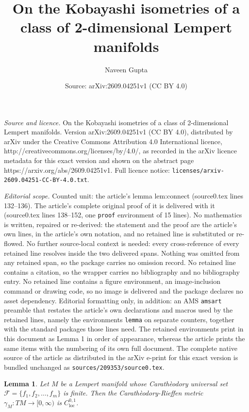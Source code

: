 \documentclass[10pt,a4paper]{amsart}
\title{On the Kobayashi isometries of a class of 2-dimensional Lempert manifolds}
\author{Naveen Gupta}
\date{Source: arXiv:2609.04251v1 (CC BY 4.0)}
\newtheorem{lemma}{Lemma}
\begin{document}
\maketitle

\noindent\emph{Source and licence.} On the Kobayashi isometries of a class of 2-dimensional Lempert manifolds. Version arXiv:2609.04251v1 (CC BY 4.0), distributed by arXiv under the Creative Commons Attribution 4.0 International licence, http://creativecommons.org/licenses/by/4.0/, as recorded in the arXiv licence metadata for this exact version and shown on the abstract page https://arxiv.org/abs/2609.04251v1. Full licence notice: \texttt{licenses/arxiv-2609.04251-CC-BY-4.0.txt}.\par\smallskip

\noindent\textit{Editorial scope.} Counted unit: the article's lemma lem:connect (source0.tex lines 132--136). The article's complete original proof of it is delivered with it (source0.tex lines 138--152, one \texttt{proof} environment of 15 lines). No mathematics is written, repaired or re-derived: the statement and the proof are the article's own lines, in the article's own notation, and no retained line is substituted or re-flowed.  No further source-local context is needed: every cross-reference of every retained line resolves inside the two delivered spans.  Nothing was omitted from any retained span, so the package carries no omission record.  No retained line contains a citation, so the wrapper carries no bibliography and no bibliography entry.  No retained line contains a figure environment, an image-inclusion command or drawing code, so no image is delivered and the package declares no asset dependency.  Editorial formatting only, in addition: an AMS \texttt{amsart} preamble that restates the article's own declarations and macros used by the retained lines, namely the environments \texttt{lemma} on separate counters, together with the standard packages those lines need.  The retained environments print in this document as Lemma 1 in order of appearance, whereas the article prints the same items with the numbering of its own full document.  The complete native source of the article as distributed in the arXiv e-print for this exact version is bundled unchanged as \texttt{sources/209353/source0.tex}.
\begin{lemma}\label{lem:connect}
Let $M$ be a Lempert manifold whose Carath\`{e}odory universal set 
$\mathcal{F}=\{f_1,f_2,\ldots,f_m\}$ is finite. Then the  Carath\`{e}odory-Rieffen 
metric $\gamma_M:TM\to [0,\infty)$ is $C_{\text{loc}}^{0,1}$.
\end{lemma}
\end{document}
